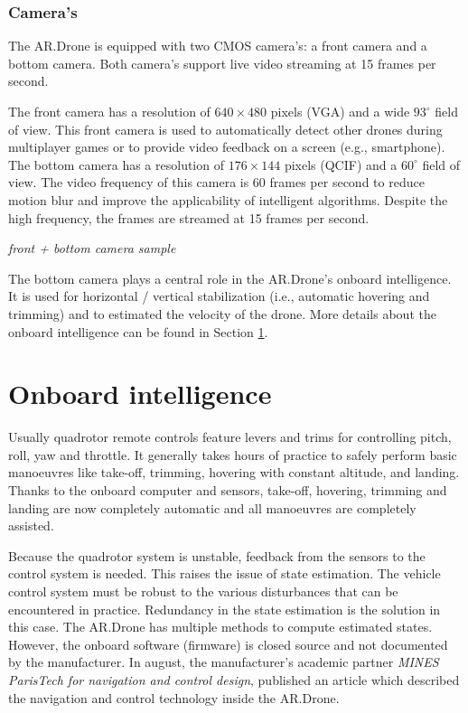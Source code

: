 \subsubsection{Camera's}
The AR.Drone is equipped with two CMOS camera's: a front camera and a bottom camera.
Both camera's support live video streaming at 15 frames per second.

The front camera has a resolution of $640 \times 480$ pixels (VGA) and a wide $93^{\circ}$ field of view.
This front camera is used to automatically detect other drones during multiplayer games or to provide video feedback on a screen (e.g., smartphone).
The bottom camera has a resolution of $176 \times 144$ pixels (QCIF) and a $60^{\circ}$ field of view.
The video frequency of this camera is 60 frames per second to reduce motion blur and improve the applicability of intelligent algorithms.
Despite the high frequency, the frames are streamed at 15 frames per second.

\textit{front + bottom camera sample}

The bottom camera plays a central role in the AR.Drone's onboard intelligence.
It is used for horizontal / vertical stabilization (i.e., automatic hovering and trimming) and to estimated the velocity of the drone.
More details about the onboard intelligence can be found in Section \ref{sec:platform_onboard_intelligence}.



\section{Onboard intelligence}
\label{sec:platform_onboard_intelligence}
Usually quadrotor remote controls feature levers and trims for controlling pitch, roll, yaw and throttle.
It generally takes hours of practice to safely perform basic manoeuvres like take-off, trimming, hovering with constant altitude, and landing.
Thanks to the onboard computer and sensors, take-off, hovering, trimming and landing are now completely automatic and all manoeuvres are completely assisted.

Because the quadrotor system is unstable, feedback from the sensors to the control system is needed.
This raises the issue of state estimation.
The vehicle control system must be robust to the various disturbances that can be encountered in practice.
Redundancy in the state estimation is the solution in this case.
The AR.Drone has multiple methods to compute estimated states.
However, the onboard software (firmware) is closed source and not documented by the manufacturer.
In august, the manufacturer's academic partner \textit{MINES ParisTech for navigation and control design}, published an article \cite{bristeau2011navigation} which described the navigation and control technology inside the AR.Drone.



